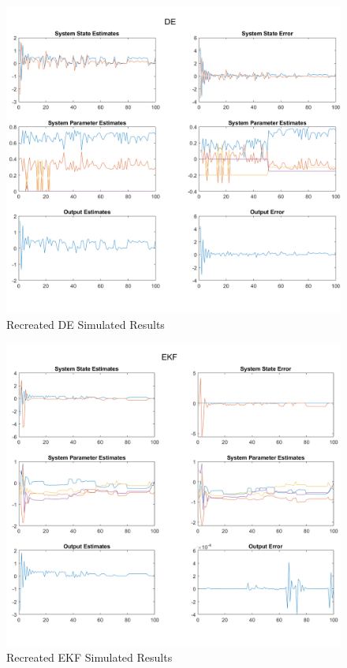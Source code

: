 \documentclass[]{article}
\begin{document}
\begin{figure}
	\centering
	\includegraphics[width=\linewidth]{../../fig/DE_no_attack}
	\caption{Recreated DE Simulated Results}
	\label{fig:denoattack}
\end{figure}

\begin{figure}
	\centering
	\includegraphics[width=\linewidth]{../../fig/EKF_no_attack}
	\caption{Recreated EKF Simulated Results}
	\label{fig:ekfnoattack}
\end{figure}
\end{document}

